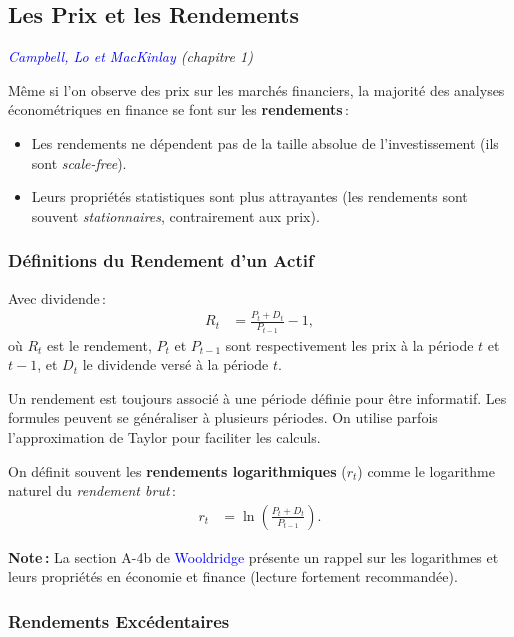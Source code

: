 \documentclass[14pt]{extarticle} %
\newcommand{\livre}[1]{\textcolor{blue}{#1}}
\begin{document}
\subsection{Les Prix et les Rendements}

\textit{\livre{Campbell, Lo et MacKinlay} (chapitre 1)}

Même si l’on observe des prix sur les marchés financiers, la majorité des analyses économétriques en finance se font sur les \textbf{rendements} :

\begin{itemize}
    \item Les rendements ne dépendent pas de la taille absolue de l’investissement (ils sont \emph{scale-free}).
    \item Leurs propriétés statistiques sont plus attrayantes (les rendements sont souvent \emph{stationnaires}, contrairement aux prix).
\end{itemize}

\subsubsection{Définitions du Rendement d’un Actif}

Avec dividende :
\begin{align*}
    R_t &= \frac{P_t + D_t}{P_{t-1}} - 1,
\end{align*}
où \(R_t\) est le rendement, \(P_t\) et \(P_{t-1}\) sont respectivement les prix à la période \(t\) et \(t-1\), et \(D_t\) le dividende versé à la période \(t\).

Un rendement est toujours associé à une période définie pour être informatif. Les formules peuvent se généraliser à plusieurs périodes. On utilise parfois l’approximation de Taylor pour faciliter les calculs.

On définit souvent les \textbf{rendements logarithmiques} (\(r_t\)) comme le logarithme naturel du \emph{rendement brut} :
\begin{align*}
    r_t &= \ln \left( \frac{P_t + D_t}{P_{t-1}} \right).
\end{align*}

\textbf{Note :} La section A-4b de \livre{Wooldridge} présente un rappel sur les logarithmes et leurs propriétés en économie et finance (lecture fortement recommandée).

\subsubsection{Rendements Excédentaires}
\end{document}
